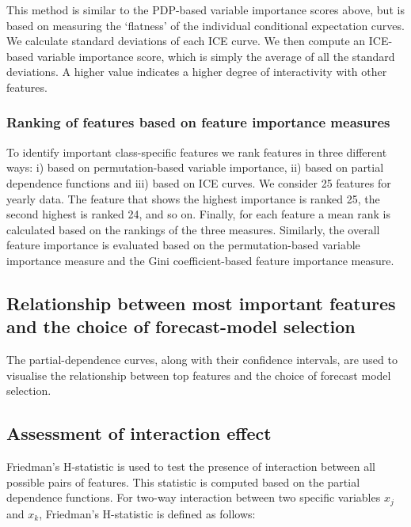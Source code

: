 \documentclass[11pt,a4paper,]{article}
\begin{document}
This method is similar to the PDP-based variable importance scores above, but is based on measuring the `flatness' of the individual conditional expectation curves. We calculate standard deviations of each ICE curve. We then compute an ICE-based variable importance score, which is simply the average of all the standard deviations. A higher value indicates a higher degree of interactivity with other features.

\hypertarget{ranking-of-features-based-on-feature-importance-measures}{%
\subsubsection{Ranking of features based on feature importance measures}\label{ranking-of-features-based-on-feature-importance-measures}}

To identify important class-specific features we rank features in three different ways: i) based on permutation-based variable importance, ii) based on partial dependence functions and iii) based on ICE curves. We consider 25 features for yearly data. The feature that shows the highest importance is ranked 25, the second highest is ranked 24, and so on. Finally, for each feature a mean rank is calculated based on the rankings of the three measures. Similarly, the overall feature importance is evaluated based on the permutation-based variable importance measure and the Gini coefficient-based feature importance measure.

\hypertarget{relationship-between-most-important-features-and-the-choice-of-forecast-model-selection}{%
\subsection{Relationship between most important features and the choice of forecast-model selection}\label{relationship-between-most-important-features-and-the-choice-of-forecast-model-selection}}

The partial-dependence curves, along with their confidence intervals, are used to visualise the relationship between top features and the choice of forecast model selection.

\hypertarget{assessment-of-interaction-effect}{%
\subsection{Assessment of interaction effect}\label{assessment-of-interaction-effect}}

Friedman's H-statistic \autocite{friedman2008predictive} is used to test the presence of interaction between all possible pairs of features. This statistic is computed based on the partial dependence functions. For two-way interaction between two specific variables \(x_j\) and \(x_k\), Friedman's H-statistic is defined as follows:
\end{document}
